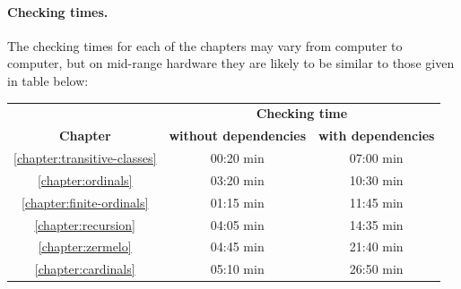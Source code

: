 \documentclass[12pt,oneside]{book}
\begin{document}
  \paragraph*{Checking times.}
  The checking times for each of the chapters may vary from computer to
  computer, but on mid-range hardware they are likely to be similar to those
  given in table below:

  \begin{center}
    \begin{tabular}{c|c|c}

      & \multicolumn{2}{c}{\textbf{Checking time}}
      \\
      \textbf{Chapter}
      & \textbf{without dependencies}     & \textbf{with dependencies}
      \\ \hline
      \ref{chapter:transitive-classes}
      & 00:20 min                         & 07:00 min
      \\
      \ref{chapter:ordinals}
      & 03:20 min                         & 10:30 min
      \\
      \ref{chapter:finite-ordinals}
      & 01:15 min                         & 11:45 min
      \\
      \ref{chapter:recursion}
      & 04:05 min                         & 14:35 min
      \\
      \ref{chapter:zermelo}
      & 04:45 min                         & 21:40 min
      \\
      \ref{chapter:cardinals}
      & 05:10 min                         & 26:50 min
    \end{tabular}
  \end{center}

  
  
  
  
  
  
\end{document}
